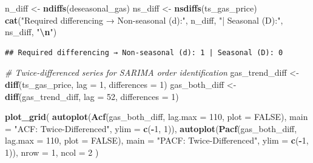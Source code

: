 \documentclass[
]{article}
\newenvironment{Shaded}{\begin{snugshade}}{\end{snugshade}}
\newcommand{\AttributeTok}[1]{\textcolor[rgb]{0.13,0.29,0.53}{#1}}
\newcommand{\CommentTok}[1]{\textcolor[rgb]{0.56,0.35,0.01}{\textit{#1}}}
\newcommand{\ConstantTok}[1]{\textcolor[rgb]{0.56,0.35,0.01}{#1}}
\newcommand{\DecValTok}[1]{\textcolor[rgb]{0.00,0.00,0.81}{#1}}
\newcommand{\FunctionTok}[1]{\textcolor[rgb]{0.13,0.29,0.53}{\textbf{#1}}}
\newcommand{\NormalTok}[1]{#1}
\newcommand{\OtherTok}[1]{\textcolor[rgb]{0.56,0.35,0.01}{#1}}
\newcommand{\SpecialCharTok}[1]{\textcolor[rgb]{0.81,0.36,0.00}{\textbf{#1}}}
\newcommand{\StringTok}[1]{\textcolor[rgb]{0.31,0.60,0.02}{#1}}
\begin{document}
\begin{Shaded}
\begin{Highlighting}[]
\NormalTok{n\_diff  }\OtherTok{\textless{}{-}} \FunctionTok{ndiffs}\NormalTok{(deseasonal\_gas)}
\NormalTok{ns\_diff }\OtherTok{\textless{}{-}} \FunctionTok{nsdiffs}\NormalTok{(ts\_gas\_price)}
\FunctionTok{cat}\NormalTok{(}\StringTok{"Required differencing → Non{-}seasonal (d):"}\NormalTok{, n\_diff,}
    \StringTok{"| Seasonal (D):"}\NormalTok{, ns\_diff, }\StringTok{"}\SpecialCharTok{\textbackslash{}n}\StringTok{"}\NormalTok{)}
\end{Highlighting}
\end{Shaded}

\begin{verbatim}
## Required differencing → Non-seasonal (d): 1 | Seasonal (D): 0
\end{verbatim}

\begin{Shaded}
\begin{Highlighting}[]
\CommentTok{\# Twice{-}differenced series for SARIMA order identification}
\NormalTok{gas\_trend\_diff }\OtherTok{\textless{}{-}} \FunctionTok{diff}\NormalTok{(ts\_gas\_price, }\AttributeTok{lag =} \DecValTok{1}\NormalTok{,  }\AttributeTok{differences =} \DecValTok{1}\NormalTok{)}
\NormalTok{gas\_both\_diff  }\OtherTok{\textless{}{-}} \FunctionTok{diff}\NormalTok{(gas\_trend\_diff, }\AttributeTok{lag =} \DecValTok{52}\NormalTok{, }\AttributeTok{differences =} \DecValTok{1}\NormalTok{)}

\FunctionTok{plot\_grid}\NormalTok{(}
  \FunctionTok{autoplot}\NormalTok{(}\FunctionTok{Acf}\NormalTok{(gas\_both\_diff,  }\AttributeTok{lag.max =} \DecValTok{110}\NormalTok{, }\AttributeTok{plot =} \ConstantTok{FALSE}\NormalTok{), }\AttributeTok{main =} \StringTok{"ACF: Twice{-}Differenced"}\NormalTok{,  }\AttributeTok{ylim =} \FunctionTok{c}\NormalTok{(}\SpecialCharTok{{-}}\DecValTok{1}\NormalTok{, }\DecValTok{1}\NormalTok{)),}
  \FunctionTok{autoplot}\NormalTok{(}\FunctionTok{Pacf}\NormalTok{(gas\_both\_diff, }\AttributeTok{lag.max =} \DecValTok{110}\NormalTok{, }\AttributeTok{plot =} \ConstantTok{FALSE}\NormalTok{), }\AttributeTok{main =} \StringTok{"PACF: Twice{-}Differenced"}\NormalTok{, }\AttributeTok{ylim =} \FunctionTok{c}\NormalTok{(}\SpecialCharTok{{-}}\DecValTok{1}\NormalTok{, }\DecValTok{1}\NormalTok{)),}
  \AttributeTok{nrow =} \DecValTok{1}\NormalTok{, }\AttributeTok{ncol =} \DecValTok{2}
\NormalTok{)}
\end{Highlighting}
\end{Shaded}
\end{document}
